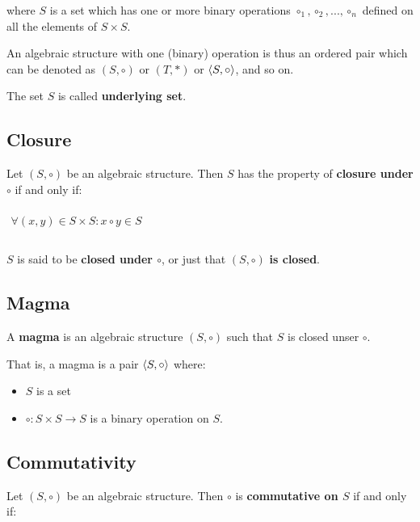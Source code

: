 where $S$ is a set which has one or more binary operations
$\circ_1, \circ_2, ..., \circ_n$ defined on all the elements of
$S \times S$.

An algebraic structure with one (binary) operation is thus an ordered
pair which can be denoted as $(S, \circ)$ or $(T, *)$ or
$\langle S, \circ \rangle$, and so on.

The set $S$ is called \textbf{underlying set}.


\subsection{Closure}
\label{sec:closure}

Let $(S, \circ)$ be an algebraic structure. Then $S$ has the property
of \textbf{closure under $\circ$} if and only if:

\begin{math}
  \begin{array}{c}
    \\
    \forall (x, y) \in S \times S : x \circ y \in S\\
    \\
  \end{array}
\end{math}


$S$ is said to be \textbf{closed under $\circ$}, or just that
$(S, \circ)$ \textbf{is closed}.

\subsection{Magma}
\label{sec:magma}

A \textbf{magma} is an algebraic structure $(S, \circ)$ such that $S$
is closed unser $\circ$.

That is, a magma is a pair $\langle S, \circ \rangle$ where:

\begin{itemize}
\item $S$ is a set
\item $\circ: S \times S \to S $ is a binary operation on $S$.
\end{itemize}




\subsection{Commutativity}
\label{sec:commutativity}

Let $(S, \circ)$ be an algebraic structure. Then $\circ$ is
\textbf{commutative on $S$} if and only if:

